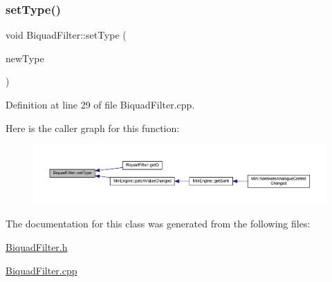 \subsubsection{\texorpdfstring{set\+Type()}{setType()}}
{\footnotesize\ttfamily void Biquad\+Filter\+::set\+Type (\begin{DoxyParamCaption}\item[{\hyperlink{class_biquad_filter_a173337ea2d17607e19495cf7b91f1110}{Biquad\+Filter\+::\+Filt\+Type}}]{new\+Type }\end{DoxyParamCaption})}



Definition at line 29 of file Biquad\+Filter.\+cpp.

Here is the caller graph for this function\+:
\nopagebreak
\begin{figure}[H]
\begin{center}
\leavevmode
\includegraphics[width=350pt]{d9/d6f/class_biquad_filter_af31a36e9f121facbabf87d303642d4e2_icgraph}
\end{center}
\end{figure}


The documentation for this class was generated from the following files\+:\begin{DoxyCompactItemize}
\item 
\hyperlink{_biquad_filter_8h}{Biquad\+Filter.\+h}\item 
\hyperlink{_biquad_filter_8cpp}{Biquad\+Filter.\+cpp}\end{DoxyCompactItemize}
